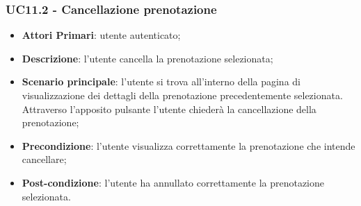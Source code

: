 \subsubsection{UC11.2 - Cancellazione prenotazione}
\begin{itemize}
	\item \textbf{Attori Primari}: utente autenticato;
	\item \textbf{Descrizione}: l'utente cancella la prenotazione selezionata;
	\item \textbf{Scenario principale}: l'utente si trova all'interno della pagina di visualizzazione dei dettagli della prenotazione precedentemente selezionata. Attraverso l'apposito pulsante l'utente chiederà la cancellazione della prenotazione;
	\item \textbf{Precondizione}: l'utente visualizza correttamente la prenotazione che intende cancellare;
	\item \textbf{Post-condizione}: l'utente ha annullato correttamente la prenotazione selezionata.
\end{itemize}

